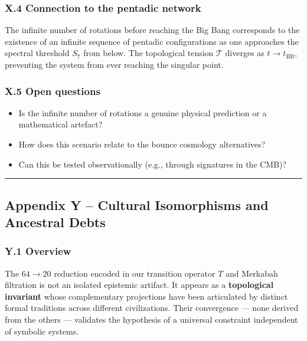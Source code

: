 \documentclass[11pt]{article}
\providecommand{\tightlist}{\setlength{\itemsep}{2pt}\setlength{\parskip}{6pt}}
\let\oldmathcal\mathcal
\renewcommand{\mathcal}[1]{\oldmathcal{#1}}
\providecommand{\tightlist}{%
  \setlength{\itemsep}{2pt}\setlength{\parskip}{6pt}
}
\begin{document}
\hypertarget{x.4-connection-to-the-pentadic-network}{%
\subsubsection{X.4 Connection to the pentadic
network}\label{x.4-connection-to-the-pentadic-network}}

The infinite number of rotations before reaching the Big Bang
corresponds to the existence of an infinite sequence of pentadic
configurations as one approaches the spectral threshold \(S_7\) from
below. The topological tension \(\mathcal{T}\) diverges as
\(t \to t_{\text{BB}}\), preventing the system from ever reaching the
singular point.

\hypertarget{x.5-open-questions}{%
\subsubsection{X.5 Open questions}\label{x.5-open-questions}}

\begin{itemize}
\tightlist
\item
  Is the infinite number of rotations a genuine physical prediction or a
  mathematical artefact?
\item
  How does this scenario relate to the bounce cosmology alternatives?
\item
  Can this be tested observationally (e.g., through signatures in the
  CMB)?
\end{itemize}

\begin{center}\rule{0.5\linewidth}{0.5pt}\end{center}

\hypertarget{appendix-y-cultural-isomorphisms-and-ancestral-debts}{%
\subsection{Appendix Y -- Cultural Isomorphisms and Ancestral
Debts}\label{appendix-y-cultural-isomorphisms-and-ancestral-debts}}

\hypertarget{y.1-overview}{%
\subsubsection{Y.1 Overview}\label{y.1-overview}}

The \(64 \to 20\) reduction encoded in our transition operator \(T\) and
Merkabah filtration is not an isolated epistemic artifact. It appears as
a \textbf{topological invariant} whose complementary projections have
been articulated by distinct formal traditions across different
civilizations. Their convergence --- none derived from the others ---
validates the hypothesis of a universal constraint independent of
symbolic systems.
\end{document}
